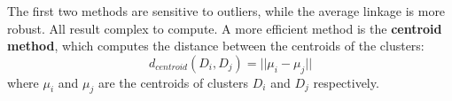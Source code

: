 The first two methods are sensitive to outliers, while the average linkage is more robust. All result complex to compute. A more efficient method is the \textbf{centroid method}, which computes the distance between the centroids of the clusters:
\[ d_{centroid}(D_i, D_j) = ||\mu_i - \mu_j|| \]
where $\mu_i$ and $\mu_j$ are the centroids of clusters $D_i$ and $D_j$ respectively.
